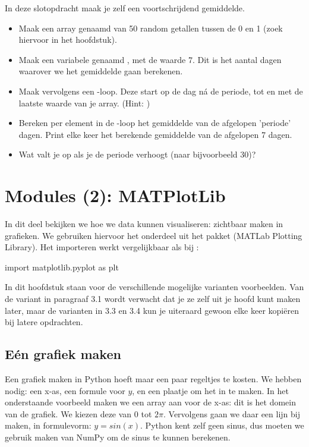 \documentclass[a4paper,11pt, fleqn]{article}
\newcommand{\ditwc}{Naam van het huidige werkcollege}
\begin{document}
In deze slotopdracht maak je zelf een voortschrijdend gemiddelde.

\begin{itemize}
	\item Maak een array genaamd  van 50 random getallen tussen de 0 en 1 (zoek hiervoor in het hoofdstuk).
	\item Maak een variabele genaamd , met de waarde 7. Dit is het aantal dagen waarover we het gemiddelde gaan berekenen.
	\item Maak vervolgens een -loop. Deze start op de dag n\'a de periode, tot en met de laatste waarde van je array. (Hint: )
	\item Bereken per element in de -loop het gemiddelde van de afgelopen 'periode' dagen. Print elke keer het berekende gemiddelde van de afgelopen 7 dagen.
	\item Wat valt je op als je de periode verhoogt (naar bijvoorbeeld 30)?
\end{itemize}

\clearpage
\renewcommand{\ditwc}{Modules(2): MATPlotLib}
\section{Modules (2): MATPlotLib}
In dit deel bekijken we hoe we data kunnen visualiseren: zichtbaar maken in grafieken. We gebruiken hiervoor het  onderdeel uit het pakket  (MATLab Plotting Library). Het importeren werkt vergelijkbaar als bij :
\begin{python}
import matplotlib.pyplot as plt
\end{python}

In dit hoofdstuk staan voor de verschillende mogelijke varianten voorbeelden. Van de variant in paragraaf 3.1 wordt verwacht dat je ze zelf uit je hoofd kunt maken later, maar de varianten in 3.3 en 3.4 kun je uiteraard gewoon elke keer kopi\"eren bij latere opdrachten.

\subsection{E\'en grafiek maken}
Een grafiek maken in Python hoeft maar een paar regeltjes te kosten. We hebben nodig: een x-as, een formule voor $y$, en een plaatje om het in te maken. In het onderstaande voorbeeld maken we een array aan voor de x-as: dit is het domein van de grafiek. We kiezen deze van $0$ tot $2\pi$. Vervolgens gaan we daar een lijn bij maken, in formulevorm: $y = sin(x)$. Python kent zelf geen sinus, dus moeten we gebruik maken van NumPy om de sinus te kunnen berekenen.
\end{document}

